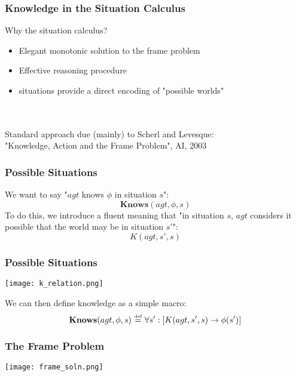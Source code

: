 \documentclass{beamer}
\newcommand{\isdef}{\hbox{$\stackrel{\mbox{\tiny def}}{=}$}}
\begin{document}
\begin{frame}
\frametitle{Knowledge in the Situation Calculus}

Why the situation calculus?
\begin{itemize}
\item Elegant monotonic solution to the frame problem
\item Effective reasoning procedure
\item situations provide a direct encoding of "possible worlds"
\end{itemize}
\ \\
\ \\
Standard approach due (mainly) to Scherl and Levesque:\\
"Knowledge, Action and the Frame Problem", AI, 2003

\end{frame}

\begin{frame}
\frametitle{Possible Situations}
We want to say "$agt$ knows $\phi$ in situation $s$":
\begin{equation*}
\mathbf{Knows}(agt,\phi,s)
\end{equation*}
To do this, we introduce a fluent meaning that "in situation $s$, $agt$ considers it possible that the world may be in situation $s'$":
\begin{equation*}
K(agt,s',s)
\end{equation*}
\end{frame}

\begin{frame}
\frametitle{Possible Situations}
\begin{center}
  \texttt{[image: k\_relation.png]}
\end{center}

We can then define knowledge as a simple macro:
\[ \mathbf{Knows}(agt,\phi,s)\ \isdef\ \forall s':\left[K(agt,s',s)\rightarrow \phi(s')\right] \]
\end{frame}

\begin{frame}
\frametitle{The Frame Problem}
\begin{center}
  \texttt{[image: frame\_soln.png]}
\end{center}
\end{frame}
\end{document}
